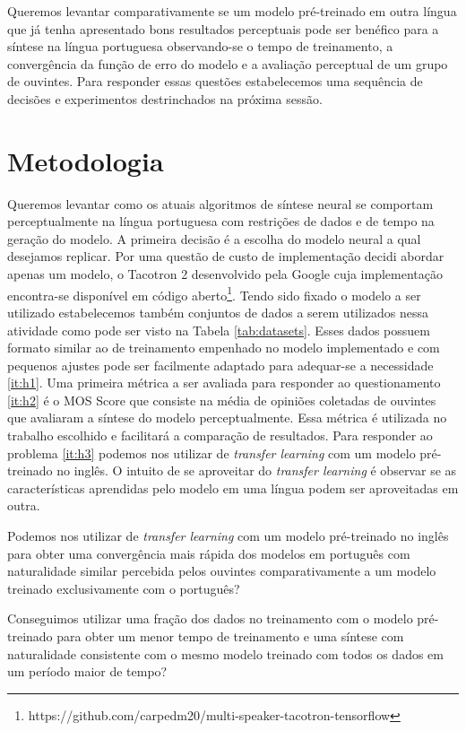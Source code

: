 \documentclass{article}
\begin{document}
Queremos levantar comparativamente se um modelo pré-treinado em outra língua que já tenha apresentado bons resultados perceptuais pode ser benéfico para a síntese na língua portuguesa observando-se o tempo de treinamento, a convergência da função de erro do modelo e a avaliação perceptual de um grupo de ouvintes.
Para responder essas questões estabelecemos uma sequência de decisões e experimentos destrinchados na próxima sessão.

\section{Metodologia}

Queremos levantar como os atuais algoritmos de síntese neural se comportam perceptualmente na língua portuguesa com restrições de dados e de tempo na geração do modelo. 
A primeira decisão é a escolha do modelo neural a qual desejamos replicar. 
Por uma questão de custo de implementação decidi abordar apenas um modelo, o Tacotron 2 \cite{tacotron2:DBLP:journals/corr/abs-1712-05884} desenvolvido pela Google cuja implementação encontra-se disponível em código aberto\footnote{https://github.com/carpedm20/multi-speaker-tacotron-tensorflow}.
Tendo sido fixado o modelo a ser utilizado estabelecemos também conjuntos de dados a serem utilizados nessa atividade como pode ser visto na Tabela \ref{tab:datasets}.
Esses dados possuem formato similar ao de treinamento empenhado no modelo implementado e com pequenos ajustes pode ser facilmente adaptado para adequar-se a necessidade \ref{it:h1}.
Uma primeira métrica a ser avaliada para responder ao questionamento \ref{it:h2} é o MOS Score que consiste na média de opiniões coletadas de ouvintes que avaliaram a síntese do modelo perceptualmente.
Essa métrica é utilizada no trabalho escolhido e facilitará a comparação de resultados.
Para responder ao problema \ref{it:h3} podemos nos utilizar de \textit{transfer learning} com um modelo pré-treinado no inglês.
O intuito de se aproveitar do \textit{transfer learning} é observar se as características aprendidas pelo modelo em uma língua podem ser aproveitadas em outra.




Podemos nos utilizar de \textit{transfer learning} com um modelo pré-treinado no inglês para obter uma convergência mais rápida dos modelos em português com naturalidade similar percebida pelos ouvintes comparativamente a um modelo treinado exclusivamente com o português?

Conseguimos utilizar uma fração dos dados no treinamento com o modelo pré-treinado para obter um menor tempo de treinamento e uma síntese com naturalidade consistente com o mesmo modelo treinado com todos os dados em um período maior de tempo?
\end{document}
